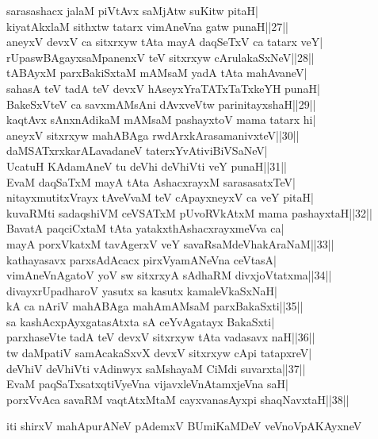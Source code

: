 \documentclass{article}
\begin{document}
sarasashacx jalaM piVtAvx saMjAtw suKitw pitaH|\\
kiyatAkxlaM sithxtw tatarx vimAneVna gatw punaH||27||\\
aneyxV devxV ca sitxrxyw tAta mayA daqSeTxV ca tatarx veY|\\
rUpaswBAgayxsaMpanenxV teV sitxrxyw cArulakaSxNeV||28||\\
tABAyxM parxBakiSxtaM mAMsaM yadA tAta mahAvaneV|\\
sahasA teV tadA teV devxV hAseyxYraTATxTaTxkeYH punaH|\\
BakeSxVteV ca savxmAMsAni dAvxveVtw parinitayxshaH||29||\\
kaqtAvx sAnxnAdikaM mAMsaM pashayxtoV mama tatarx hi|\\
aneyxV sitxrxyw mahABAga rwdArxkArasamanivxteV||30||\\
daMSATxrxkarALavadaneV taterxYvAtiviBiVSaNeV|\\
UcatuH KAdamAneV tu deVhi deVhiVti veY punaH||31||\\
EvaM daqSaTxM mayA tAta  AshacxrayxM sarasasatxTeV|\\
nitayxmutitxVrayx tAveVvaM teV cApayxneyxV ca veY pitaH|\\
kuvaRMti sadaqshiVM ceVSATxM pUvoRVkAtxM mama pashayxtaH||32||\\
BavatA paqciCxtaM tAta yatakxthAshacxrayxmeVva ca|\\
mayA porxVkatxM tavAgerxV veY savaRsaMdeVhakAraNaM||33||\\
kathayasavx parxsAdAcacx pirxVyamANeVna ceVtasA|\\
vimAneVnAgatoV yoV sw sitxrxyA sAdhaRM divxjoVtatxma||34||\\
divayxrUpadharoV yasutx sa kasutx kamaleVkaSxNaH|\\
kA ca nAriV mahABAga mahAmAMsaM parxBakaSxti||35||\\
sa kashAcxpAyxgatasAtxta sA ceYvAgatayx BakaSxti|\\
parxhaseVte tadA teV devxV sitxrxyw tAta vadasavx naH||36||\\
tw daMpatiV samAcakaSxvX devxV sitxrxyw cApi tatapxreV|\\
deVhiV deVhiVti vAdinwyx saMshayaM CiMdi suvarxta||37||\\
EvaM paqSaTxsatxqtiVyeVna vijavxleVnAtamxjeVna saH|\\
porxVvAca savaRM vaqtAtxMtaM cayxvanasAyxpi shaqNavxtaH||38||

\begin{center}
iti shirxV mahApurANeV pAdemxV BUmiKaMDeV veVnoVpAKAyxneV
\end{center}
\end{document}
